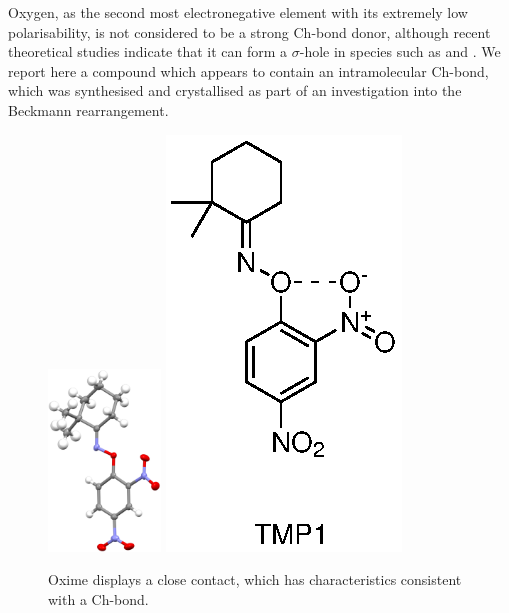 \begin{refsection}
Oxygen, as the second most electronegative element with its extremely low polarisability, is not considered to be a strong Ch-bond donor, although recent theoretical studies indicate that it can form a $\sigma$-hole in species such as  and .\autocite{Varadwaj2019a,Varadwaj2019}
We report here a compound which appears to contain an intramolecular  Ch-bond, which was synthesised and crystallised as part of an investigation into the Beckmann rearrangement.\autocite{Yeoh2012}

\begin{figure}
\centering
\includegraphics[width=3cm]{Figures/dimethylcyclohexanone-oxime-dnp-xray.pdf}
\hspace{0.5cm}
\includegraphics[scale=0.74]{Figures/dimethylcyclohexanone-oxime-dnp.eps}
\caption[Oxime  displays a close  contact.]{Oxime  displays a close  contact, which has characteristics consistent with a Ch-bond.}\label{fig:dimethylcyclohexanone-oxime-dn}
\end{figure}


\end{refsection}
